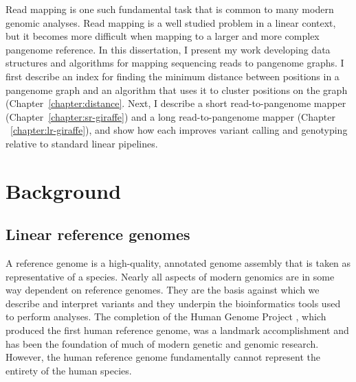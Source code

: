 \documentclass[11pt]{ucscthesis}
\begin{document}
Read mapping is one such fundamental task that is common to many modern genomic analyses.
Read mapping is a well studied problem in a linear context, but it becomes more difficult when mapping to a larger and more complex pangenome reference.
In this dissertation, I present my work developing data structures and algorithms for mapping sequencing reads to pangenome graphs.
I first describe an index for finding the minimum distance between positions in a pangenome graph and an algorithm that uses it to cluster positions on the graph (Chapter~\ref{chapter:distance}.
Next, I describe a short read-to-pangenome mapper (Chapter~\ref{chapter:sr-giraffe}) and a long read-to-pangenome mapper (Chapter ~\ref{chapter:lr-giraffe}), and show how each improves variant calling and genotyping relative to standard linear pipelines.

\chapter{Background}
\label{chapter:background}

\section{Linear reference genomes}
\label{sec:background:linear-genomes}

A reference genome is a high-quality, annotated genome assembly that is taken as representative of a species. 
Nearly all aspects of modern genomics are in some way dependent on reference genomes.
They are the basis against which we describe and interpret variants and they underpin the bioinformatics tools used to perform analyses.
The completion of the Human Genome Project \cite{lander_initial_2001}, which produced the first human reference genome, was a landmark accomplishment and has been the foundation of much of modern genetic and genomic research.
However, the human reference genome fundamentally cannot represent the entirety of the human species.
\end{document}
